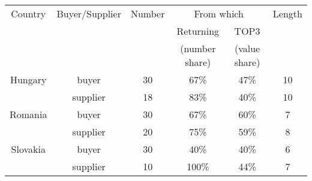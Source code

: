 
\begin{tabular}{cccccc}
\hline
    Country & Buyer/Supplier & Number & \multicolumn{2}{c}{From which} & Length \\
     & & & Returning & TOP3 & \\
     &&&(number share) & (value share) & \\
     \hline
     Hungary  & buyer & 30 & 67\% & 47\% &10 \\
              & supplier & 18 & 83\% & 40\% &10 \\ 
     Romania  & buyer & 30 & 67\% & 60\% &7 \\
              & supplier & 20 & 75\% & 59\% &8 \\
     Slovakia & buyer & 30 & 40\% & 40\% &6 \\
              & supplier & 10 & 100\% & 44\% &7 \\ \hline
\end{tabular}
